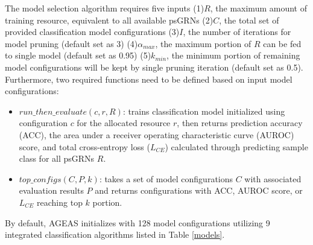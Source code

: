 \documentclass[fleqn,10pt]{wlscirep}
\begin{document}
    The model selection algorithm requires five inputs
    (1)$R$, the maximum amount of training resource, equivalent to all available psGRNs
    (2)$C$, the total set of provided classification model configurations
    (3)$I$, the number of iterations for model pruning (default set as 3)
    (4)$\alpha_{max}$, the maximum portion of $R$ can be fed to single model (default set as 0.95)
    (5)$k_{min}$, the minimum portion of remaining model configurations will be kept by single pruning iteration (default set as 0.5).
    Furthermore, two required functions need to be defined based on input model configurations:
    \begin{itemize}
    \setlength\itemsep{0em}
    \item \textbf{$run\_then\_evaluate(c, r, R)$}: trains classification model initialized using configuration $c$ for the allocated resource $r$, then returns prediction accuracy (ACC), the area under a receiver operating characteristic curve (AUROC)\cite{hanley_mcneil_1982} score, and total cross-entropy loss ($L_{CE}$) calculated through predicting sample class for all psGRNs $R$.

    \item \textbf{$top\_configs(C, P, k)$}: takes a set of model configurations $C$ with associated evaluation results $P$ and returns configurations with ACC, AUROC score, or $L_{CE}$ reaching top $k$ portion.
    \end{itemize}

    \noindent By default, AGEAS initializes with 128 model configurations utilizing 9 integrated classification algorithms listed in Table \ref{models}.
\end{document}
